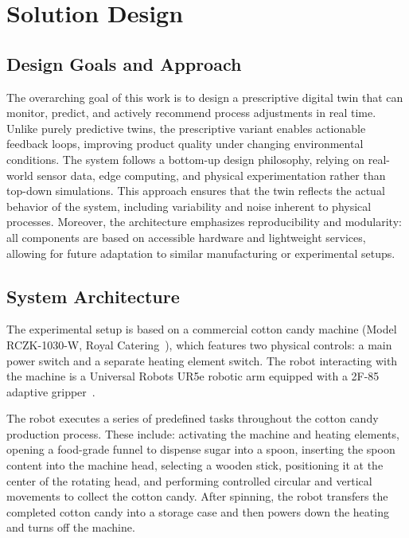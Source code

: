 \chapter{Solution Design}
\label{sec:solution}


\section{Design Goals and Approach}
The overarching goal of this work is to design a prescriptive digital twin that can monitor, predict, and actively recommend process adjustments in real time. Unlike purely predictive twins, the prescriptive variant enables actionable feedback loops, improving product quality under changing environmental conditions. The system follows a bottom-up design philosophy, relying on real-world sensor data, edge computing, and physical experimentation rather than top-down simulations. This approach ensures that the twin reflects the actual behavior of the system, including variability and noise inherent to physical processes. Moreover, the architecture emphasizes reproducibility and modularity: all components are based on accessible hardware and lightweight services, allowing for future adaptation to similar manufacturing or experimental setups.


\section{System Architecture}

The experimental setup is based on a commercial cotton candy machine (Model RCZK-1030-W, Royal Catering~\cite{ccmachine-manual}), which features two physical controls: a main power switch and a separate heating element switch. The robot interacting with the machine is a Universal Robots UR5e robotic arm equipped with a 2F-85 adaptive gripper~\cite{ur5e-manual}.

The robot executes a series of predefined tasks throughout the cotton candy production process. These include: activating the machine and heating elements, opening a food-grade funnel to dispense sugar into a spoon, inserting the spoon content into the machine head, selecting a wooden stick, positioning it at the center of the rotating head, and performing controlled circular and vertical movements to collect the cotton candy. After spinning, the robot transfers the completed cotton candy into a storage case and then powers down the heating and turns off the machine.

